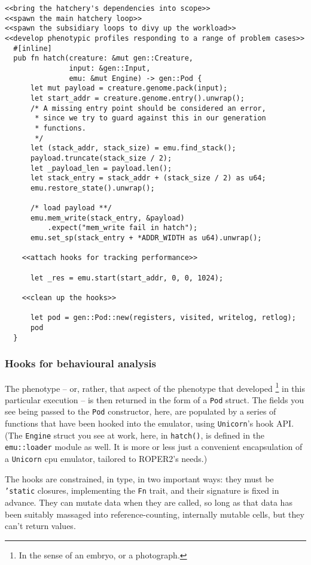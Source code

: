 \documentclass[11pt]{article}
\begin{document}
\lstset{language=rust,label=orgef6e44c,caption= ,captionpos=b,numbers=none}
\begin{lstlisting}
<<bring the hatchery's dependencies into scope>>
<<spawn the main hatchery loop>>
<<spawn the subsidiary loops to divy up the workload>>
<<develop phenotypic profiles responding to a range of problem cases>>
  #[inline]
  pub fn hatch(creature: &mut gen::Creature, 
               input: &gen::Input, 
               emu: &mut Engine) -> gen::Pod {
      let mut payload = creature.genome.pack(input);
      let start_addr = creature.genome.entry().unwrap();
      /* A missing entry point should be considered an error,
       * since we try to guard against this in our generation
       * functions.
       */
      let (stack_addr, stack_size) = emu.find_stack();
      payload.truncate(stack_size / 2);
      let _payload_len = payload.len();
      let stack_entry = stack_addr + (stack_size / 2) as u64;
      emu.restore_state().unwrap();

      /* load payload **/
      emu.mem_write(stack_entry, &payload)
          .expect("mem_write fail in hatch");
      emu.set_sp(stack_entry + *ADDR_WIDTH as u64).unwrap();

    <<attach hooks for tracking performance>>

      let _res = emu.start(start_addr, 0, 0, 1024);

    <<clean up the hooks>>

      let pod = gen::Pod::new(registers, visited, writelog, retlog);
      pod
  }
\end{lstlisting}


\subsubsection{Hooks for behavioural analysis}
\label{sec:org7b88dbd}
The phenotype -- or, rather, that aspect of the phenotype that developed
\footnote{In the sense of an embryo, or a photograph.} in this particular execution
-- is then returned in the form of a \texttt{Pod} struct. The fields you see being
passed to the \texttt{Pod} constructor, here, are populated by a series of functions
that have been hooked into the emulator, using \texttt{Unicorn}'s hook API. (The
\texttt{Engine} struct you see at work, here, in \texttt{hatch()}, is defined in the
\texttt{emu::loader} module as well. It is more or less just a convenient 
encapsulation of a \texttt{Unicorn} \gls{cpu} emulator, tailored to ROPER2's needs.)

The hooks are constrained, in type, in two important ways: they must be
\texttt{'static} closures, implementing the \texttt{Fn} trait, and their signature is
fixed in advance. They can mutate data when they are called, so long as
that data has been suitably massaged into reference-counting, internally
mutable cells, but they can't return values. 
\end{document}
